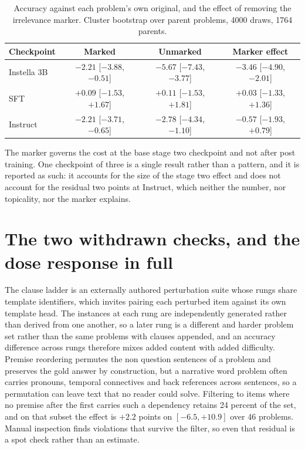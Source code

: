 \documentclass{article}
\begin{document}
\begin{table}[h]
\centering
\caption{Accuracy against each problem's own original, and the effect of removing the
irrelevance marker. Cluster bootstrap over parent problems, 4000 draws, 1764 parents.}
\small
\begin{tabular}{lccc}
\toprule
Checkpoint & Marked & Unmarked & Marker effect \\
\midrule
Instella 3B & $-2.21$ [$-3.88$, $-0.51$] & $-5.67$ [$-7.43$, $-3.77$] & $\mathbf{-3.46}$ [$-4.90$, $-2.01$] \\
SFT         & $+0.09$ [$-1.53$, $+1.67$] & $+0.11$ [$-1.53$, $+1.81$] & $+0.03$ [$-1.33$, $+1.36$] \\
Instruct    & $-2.21$ [$-3.71$, $-0.65$] & $-2.78$ [$-4.34$, $-1.10$] & $-0.57$ [$-1.93$, $+0.79$] \\
\bottomrule
\end{tabular}
\end{table}

The marker governs the cost at the base stage two checkpoint and not after post training.
One checkpoint of three is a single result rather than a pattern, and it is reported as
such: it accounts for the size of the stage two effect and does not account for the
residual two points at Instruct, which neither the number, nor topicality, nor the marker
explains.

\section{The two withdrawn checks, and the dose response in full}
\label{app:dose}

The clause ladder is an externally authored perturbation suite whose rungs share template
identifiers, which invites pairing each perturbed item against its own template head. The
instances at each rung are independently generated rather than derived from one another, so
a later rung is a different and harder problem set rather than the same problems with
clauses appended, and an accuracy difference across rungs therefore mixes added content with
added difficulty. Premise reordering permutes the non question sentences of a problem and
preserves the gold answer by construction, but a narrative word problem often carries
pronouns, temporal connectives and back references across sentences, so a permutation can
leave text that no reader could solve. Filtering to items where no premise after the first
carries such a dependency retains 24 percent of the set, and on that subset the effect is
$+2.2$ points on $[-6.5, +10.9]$ over 46 problems. Manual inspection finds violations that
survive the filter, so even that residual is a spot check rather than an estimate.
\end{document}

